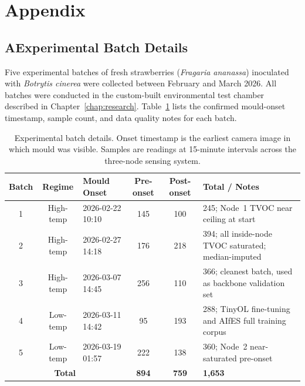 \chapter*{Appendix}\label{appendix}

\section*{A\quad Experimental Batch Details}

Five experimental batches of fresh strawberries (\textit{Fragaria ananassa}) inoculated with \textit{Botrytis cinerea} were collected between February and March 2026. All batches were conducted in the custom-built environmental test chamber described in Chapter~\ref{chap:research}. Table~\ref{tab:app_batches} lists the confirmed mould-onset timestamp, sample count, and data quality notes for each batch.

\begin{table}[htbp]
\centering
\caption{Experimental batch details. Onset timestamp is the earliest camera image in which mould was visible. Samples are readings at 15-minute intervals across the three-node sensing system.}
\label{tab:app_batches}
\begin{tabular}{|c|c|p{}|c|c|p{}|}
\hline
\textbf{Batch} & \textbf{Regime} & \textbf{Mould Onset} & \textbf{Pre-onset} & \textbf{Post-onset} & \textbf{Total / Notes} \\
\hline
1 & High-temp & 2026-02-22 10:10 & 145 & 100 & 245; Node~1 TVOC near ceiling at start \\
\hline
2 & High-temp & 2026-02-27 14:18 & 176 & 218 & 394; all inside-node TVOC saturated; median-imputed \\
\hline
3 & High-temp & 2026-03-07 14:45 & 256 & 110 & 366; cleanest batch, used as backbone validation set \\
\hline
4 & Low-temp  & 2026-03-11 14:42 & 95  & 193 & 288; TinyOL fine-tuning and AIfES full training corpus \\
\hline
5 & Low-temp  & 2026-03-19 01:57 & 222 & 138 & 360; Node~2 near-saturated pre-onset \\
\hline
\multicolumn{3}{|c|}{\textbf{Total}} & \textbf{894} & \textbf{759} & \textbf{1,653} \\
\hline
\end{tabular}
\end{table}

